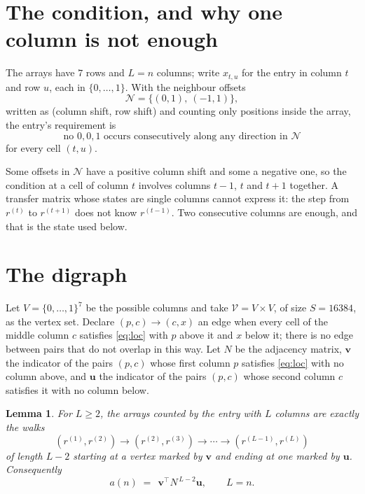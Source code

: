 \documentclass[11pt,a4paper]{article}
\theoremstyle{plain}
\newtheorem{lemma}[theorem]{Lemma}
\theoremstyle{definition}
\begin{document}
\section{The condition, and why one column is not enough}

The arrays have $7$ rows and $L=n$ columns; write $x_{t,u}$ for the entry in
column $t$ and row $u$, each in $\{0,\dots,1\}$. With the neighbour offsets
\[
\mathcal N=\{(0,1),\ (-1,1)\},
\]
written as (column shift, row shift) and counting only positions inside the array, the
entry's requirement is
\begin{equation}\label{eq:loc}
\text{no }0,0,1\text{ occurs consecutively along any direction in }\mathcal N
\end{equation}
for every cell $(t,u)$.

Some offsets in $\mathcal N$ have a positive column shift and some a negative one, so the
condition at a cell of column $t$ involves columns $t-1$, $t$ and $t+1$ together. A transfer
matrix whose states are single columns cannot express it: the step from $r^{(t)}$ to
$r^{(t+1)}$ does not know $r^{(t-1)}$. Two consecutive columns are enough, and that is
the state used below.

\section{The digraph}

Let $V=\{0,\dots,1\}^{7}$ be the possible columns and take
$\mathcal V=V\times V$, of size $S=16384$, as the vertex set. Declare $(p,c)\to(c,x)$ an edge
when every cell of the middle column $c$ satisfies \eqref{eq:loc} with $p$ above it and $x$
below it; there is no edge between pairs that do not overlap in this way. Let $N$ be the
adjacency matrix, $\mathbf{v}$ the indicator of the pairs $(p,c)$ whose first column $p$
satisfies \eqref{eq:loc} with no column above, and $\mathbf{u}$ the indicator of
the pairs $(p,c)$ whose second column $c$ satisfies it with no column below.

\begin{lemma}\label{lem:walk}
For $L\ge2$, the arrays counted by the entry with $L$ columns are exactly the walks
\[
(r^{(1)},r^{(2)})\to(r^{(2)},r^{(3)})\to\cdots\to(r^{(L-1)},r^{(L)})
\]
of length $L-2$ starting at a vertex marked by $\mathbf{v}$ and ending at one marked by
$\mathbf{u}$. Consequently
\[
a(n)\;=\;\,\mathbf{v}^{\!\top}N^{\,L-2}\mathbf{u},\qquad L=n .
\]
\end{lemma}
\end{document}
